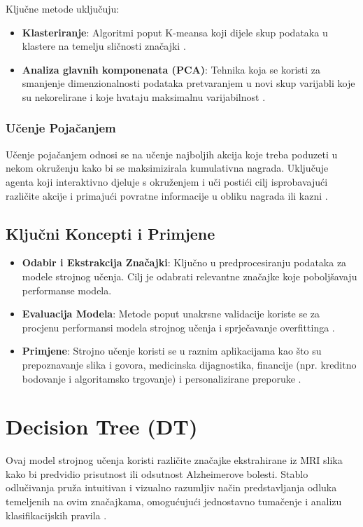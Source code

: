 \documentclass[zavrsnirad]{fer}
\begin{document}
Ključne metode uključuju:

\begin{itemize}
	\item \textbf{Klasteriranje}: Algoritmi poput K-meansa koji dijele skup podataka u klastere na temelju sličnosti značajki \cite{somvanshi2016}.
	\item \textbf{Analiza glavnih komponenata (PCA)}: Tehnika koja se koristi za smanjenje dimenzionalnosti podataka pretvaranjem u novi skup varijabli koje su nekorelirane i koje hvataju maksimalnu varijabilnost \cite{somvanshi2016}.
\end{itemize}

\subsubsection{Učenje Pojačanjem}

Učenje pojačanjem odnosi se na učenje najboljih akcija koje treba poduzeti u nekom okruženju kako bi se maksimizirala kumulativna nagrada. Uključuje agenta koji interaktivno djeluje s okruženjem i uči postići cilj isprobavajući različite akcije i primajući povratne informacije u obliku nagrada ili kazni \cite{mahesh2019}.

\subsection{Ključni Koncepti i Primjene}

\begin{itemize}
	\item \textbf{Odabir i Ekstrakcija Značajki}: Ključno u predprocesiranju podataka za modele strojnog učenja. Cilj je odabrati relevantne značajke koje poboljšavaju performanse modela.
	\item \textbf{Evaluacija Modela}: Metode poput unakrsne validacije koriste se za procjenu performansi modela strojnog učenja i sprječavanje overfittinga \cite{ibm_machine_learning}.
	\item \textbf{Primjene}: Strojno učenje koristi se u raznim aplikacijama kao što su prepoznavanje slika i govora, medicinska dijagnostika, financije (npr. kreditno bodovanje i algoritamsko trgovanje) i personalizirane preporuke \cite{ibm_machine_learning}.
\end{itemize}


\section{Decision Tree (DT)}
Ovaj model strojnog učenja koristi različite značajke ekstrahirane iz MRI slika kako bi predvidio prisutnost ili odsutnost Alzheimerove bolesti. Stablo odlučivanja pruža intuitivan i vizualno razumljiv način predstavljanja odluka temeljenih na ovim značajkama, omogućujući jednostavno tumačenje i analizu klasifikacijskih pravila \cite{somvanshi2016}.
\end{document}
